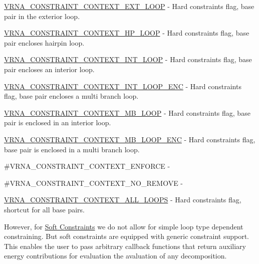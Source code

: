 \begin{DoxyItemize}
\item \hyperlink{group__hard__constraints_ga9418eda62a5dec070896702c279d2548}{V\+R\+N\+A\+\_\+\+C\+O\+N\+S\+T\+R\+A\+I\+N\+T\+\_\+\+C\+O\+N\+T\+E\+X\+T\+\_\+\+E\+X\+T\+\_\+\+L\+O\+O\+P} -\/ Hard constraints flag, base pair in the exterior loop.
\item \hyperlink{group__hard__constraints_ga79203702b197b6b9d3b78eed40663eb1}{V\+R\+N\+A\+\_\+\+C\+O\+N\+S\+T\+R\+A\+I\+N\+T\+\_\+\+C\+O\+N\+T\+E\+X\+T\+\_\+\+H\+P\+\_\+\+L\+O\+O\+P} -\/ Hard constraints flag, base pair encloses hairpin loop.
\item \hyperlink{group__hard__constraints_ga21feeab3a9e5fa5a9e3d9ac0fcf5994f}{V\+R\+N\+A\+\_\+\+C\+O\+N\+S\+T\+R\+A\+I\+N\+T\+\_\+\+C\+O\+N\+T\+E\+X\+T\+\_\+\+I\+N\+T\+\_\+\+L\+O\+O\+P} -\/ Hard constraints flag, base pair encloses an interior loop.
\item \hyperlink{group__hard__constraints_ga0536288e04ff6332ecdc23ca4705402b}{V\+R\+N\+A\+\_\+\+C\+O\+N\+S\+T\+R\+A\+I\+N\+T\+\_\+\+C\+O\+N\+T\+E\+X\+T\+\_\+\+I\+N\+T\+\_\+\+L\+O\+O\+P\+\_\+\+E\+N\+C} -\/ Hard constraints flag, base pair encloses a multi branch loop.
\item \hyperlink{group__hard__constraints_ga456ecd2ff00056bb64da8dd4f61bbfc5}{V\+R\+N\+A\+\_\+\+C\+O\+N\+S\+T\+R\+A\+I\+N\+T\+\_\+\+C\+O\+N\+T\+E\+X\+T\+\_\+\+M\+B\+\_\+\+L\+O\+O\+P} -\/ Hard constraints flag, base pair is enclosed in an interior loop.
\item \hyperlink{group__hard__constraints_ga02a3d703ddbcfce393e4bbfcb9db7077}{V\+R\+N\+A\+\_\+\+C\+O\+N\+S\+T\+R\+A\+I\+N\+T\+\_\+\+C\+O\+N\+T\+E\+X\+T\+\_\+\+M\+B\+\_\+\+L\+O\+O\+P\+\_\+\+E\+N\+C} -\/ Hard constraints flag, base pair is enclosed in a multi branch loop.
\item \#\+V\+R\+N\+A\+\_\+\+C\+O\+N\+S\+T\+R\+A\+I\+N\+T\+\_\+\+C\+O\+N\+T\+E\+X\+T\+\_\+\+E\+N\+F\+O\+R\+C\+E -\/
\item \#\+V\+R\+N\+A\+\_\+\+C\+O\+N\+S\+T\+R\+A\+I\+N\+T\+\_\+\+C\+O\+N\+T\+E\+X\+T\+\_\+\+N\+O\+\_\+\+R\+E\+M\+O\+V\+E -\/
\item \hyperlink{group__hard__constraints_ga886d9127c49bb982a4b67cd7581e8a5a}{V\+R\+N\+A\+\_\+\+C\+O\+N\+S\+T\+R\+A\+I\+N\+T\+\_\+\+C\+O\+N\+T\+E\+X\+T\+\_\+\+A\+L\+L\+\_\+\+L\+O\+O\+P\+S} -\/ Hard constraints flag, shortcut for all base pairs.
\end{DoxyItemize}

However, for \hyperlink{group__soft__constraints}{Soft Constraints} we do not allow for simple loop type dependent constraining. But soft constraints are equipped with generic constraint support. This enables the user to pass arbitrary callback functions that return auxiliary energy contributions for evaluation the avaluation of any decomposition.

